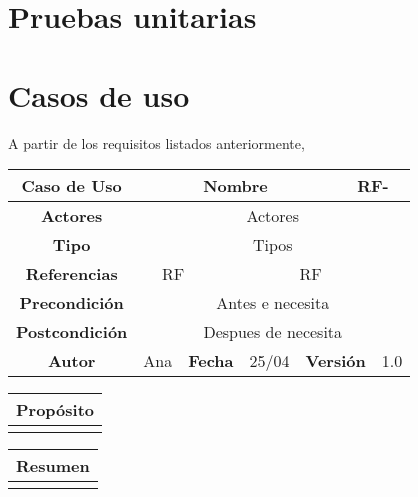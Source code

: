 \section{Pruebas unitarias}



\section{Casos de uso}

A partir de los requisitos listados anteriormente,  


\begin{table}[!h]
\begin{tabular}{|c|c|c|c|c|c|c|c|}
\hline
\textbf{Caso de Uso} & \multicolumn{5}{|c|}{Nombre} & \multicolumn{2}{|c|}{RF-} \\
\hline
\textbf{Actores}              & \multicolumn{7}{|c|}{Actores}           \\
\hline
\textbf{Tipo}                 & \multicolumn{7}{|c|}{Tipos}             \\
\hline
\textbf{Referencias}          & \multicolumn{2}{|c|}{RF}           & \multicolumn{5}{|c|}{RF}\\
\hline
\textbf{Precondición}         & \multicolumn{7}{|c|}{Antes e necesita}             \\
\hline
\textbf{Postcondición}        & \multicolumn{7}{|c|}{Despues de necesita}              \\
\hline
\textbf{Autor}                &   Ana   & \multicolumn{2}{|c|}{\textbf{Fecha}} &  25/04   & \multicolumn{2}{|c|}{\textbf{Versión}} & 1.0  \\
\hline
\end{tabular}
\end{table}

\begin{table}[!h]
\begin{tabular}{|c|}
\hline
\textbf{Propósito} \\
\hline
                   \\
\hline
\end{tabular}
\end{table}

\begin{table}[!h]
\begin{tabular}{|c|}
\hline
\textbf{Resumen}  \\
\hline
                   \\
\hline
\end{tabular}
\end{table}

